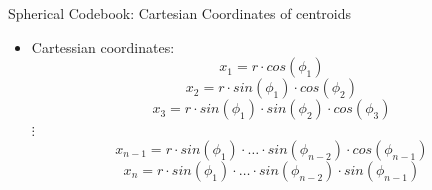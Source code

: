 \documentclass[10pt]{beamer}
\begin{document}
\begin{frame}{Spherical Codebook: Cartesian Coordinates of centroids}
  \begin{itemize}
    \item Cartessian coordinates:\footnotemark{}
    \begin{equation*}
      x_{1} = r \cdot cos(\phi_{1})
    \end{equation*}
    \begin{equation*}
      x_{2} = r \cdot sin(\phi_{1}) \cdot cos(\phi_{2})
    \end{equation*}
    \begin{equation*}
      x_{3} = r \cdot sin(\phi_{1}) \cdot sin(\phi_{2}) \cdot cos(\phi_{3})
    \end{equation*}
    \centering $\vdots$
    \begin{equation*}
      x_{n-1} = r \cdot sin(\phi_{1}) \cdot \dotsc \cdot sin(\phi_{n-2}) \cdot cos(\phi_{n-1})
    \end{equation*}
    \begin{equation*}
      x_{n} = r \cdot sin(\phi_{1}) \cdot \dotsc \cdot sin(\phi_{n-2})  \cdot sin(\phi_{n-1})
    \end{equation*}
  \end{itemize}
  \vspace{40pt}
  \begin{figure}
    \begin{minipage}{\textwidth}
             \\
    \end{minipage}
\end{figure}
\end{frame}
\end{document}
